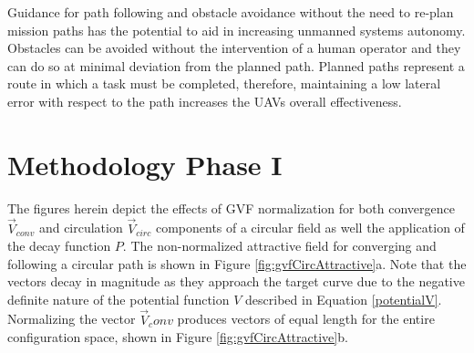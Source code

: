 \documentclass[numbered,pdftex]{ohio-etd}
\begin{document}
Guidance for path following and obstacle avoidance without the need to re-plan mission paths has the potential to aid in increasing unmanned systems autonomy. Obstacles can be avoided without the intervention of a human operator and they can do so at minimal deviation from the planned path. Planned paths represent a route in which a task must be completed, therefore, maintaining a low lateral error with respect to the path increases the UAVs overall effectiveness.



   



\appendix
\chapter{Methodology Phase I}

The figures herein depict the effects of GVF normalization for both convergence $\overrightarrow{V}_{conv}$ and circulation $\overrightarrow{V}_{circ}$ components of a circular field as well the application of the decay function $P$. The non-normalized attractive field for converging and following a circular path is shown in Figure \ref{fig:gvfCircAttractive}a. Note that the vectors decay in magnitude as they approach the target curve due to the negative definite nature of the potential function $V$ described in Equation \ref{potentialV}. Normalizing the vector $\overrightarrow{V}_conv$ produces vectors of equal length for the entire configuration space, shown in Figure \ref{fig:gvfCircAttractive}b.
\end{document}
